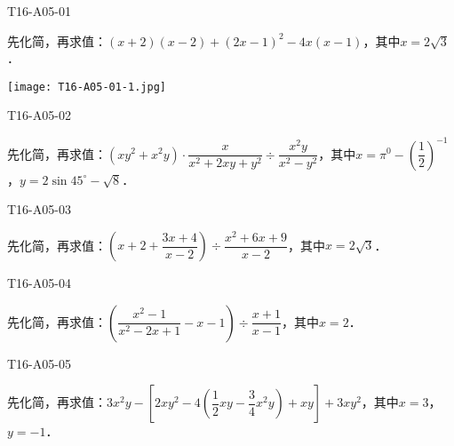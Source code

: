 
\begin{defproblem}{T16-A05-01}%
\begin{onlyproblem}%
先化简，再求值：$(x+2)(x-2)+(2x-1)^{2}-4x(x-1)$，其中$x=2\sqrt 3 $．
\end{onlyproblem}%
\begin{onlysolution}%
\texttt{[image: T16-A05-01-1.jpg]}
\end{onlysolution}%
\end{defproblem}


\begin{defproblem}{T16-A05-02}%
\begin{onlyproblem}%
先化简，再求值：$(xy^2+x^2y)\cdot \dfrac{x}{x^2+2xy+y^2}\div \dfrac{x^2y}{x^2-y^2}$，其中$x=\pi ^0-\left(\dfrac{1}{2}\right)^{-1}$，$y=2\sin 45^{\circ}-\sqrt 8 $．

\end{onlyproblem}%
\begin{onlysolution}%

\end{onlysolution}%
\end{defproblem}


\begin{defproblem}{T16-A05-03}%
\begin{onlyproblem}%
先化简，再求值：$\left(x+2+\dfrac{3x+4}{x-2}\right)\div \dfrac{x^2+6x+9}{x-2}$，其中$x=2\sqrt 3 $．

\end{onlyproblem}%
\begin{onlysolution}%

\end{onlysolution}%
\end{defproblem}


\begin{defproblem}{T16-A05-04}%
\begin{onlyproblem}%
先化简，再求值：$\left(\dfrac{x^2-1}{x^2-2x+1}-x-1\right)\div \dfrac{x+1}{x-1}$，其中$x=2$．
\end{onlyproblem}%
\begin{onlysolution}%

\end{onlysolution}%
\end{defproblem}


\begin{defproblem}{T16-A05-05}%
\begin{onlyproblem}%
先化简，再求值：$3x^2y-\left[2xy^2-4\left(\dfrac{1}{2}xy-\dfrac{3}{4}x^2y\right)+xy\right]+3xy^2$，其中$x=3$，$y=-1$．
\end{onlyproblem}%
\begin{onlysolution}%

\end{onlysolution}%
\end{defproblem}


